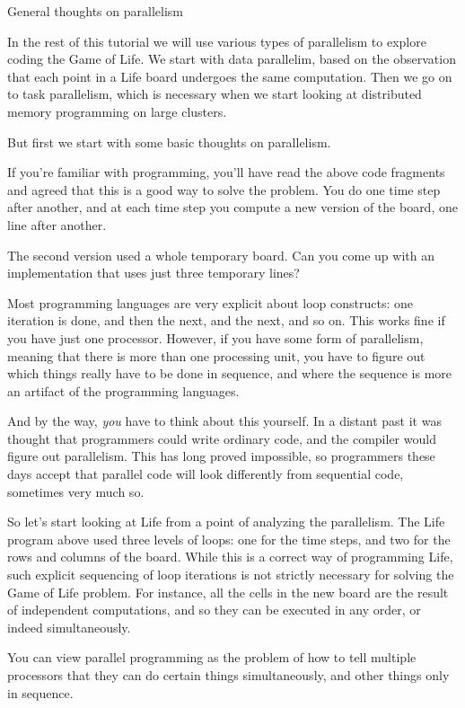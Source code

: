  {General thoughts on parallelism}

In the rest of this tutorial we will use various types of parallelism
to explore coding the Game of Life. We start with data parallelim,
based on the observation that each point in a Life board undergoes the
same computation. Then we go on to task parallelism, which is necessary
when we start
looking at distributed memory programming on large clusters.

But first we start with some basic thoughts on parallelism.

If you're familiar with programming, you'll have read the 
above code fragments and agreed that this is a good way to 
solve the problem. You do one time step after another, and
at each time step you compute 
a new version of the board, one line after another.

\begin{exercise}
  The second version used a whole temporary board. Can you come
  up with an implementation that uses just three temporary lines?
\end{exercise}

Most programming languages are very explicit about loop constructs: 
one iteration is done, and then the next, and the next, and so on.
This works fine if you 
have just one processor. However, if you have some form of parallelism,
meaning that there is more than one processing unit, you have to 
figure out which things really have to be done in sequence,
and where the sequence is more an artifact of the programming languages.

And by the way, \emph{you} have to think about this yourself.
In a distant past it was thought that programmers could write
ordinary code, and the compiler would figure out parallelism. This has
long proved impossible, so programmers these days accept that parallel
code will look differently from sequential code, sometimes very much so.

So let's start looking at Life from a point of analyzing the parallelism.
The Life program above used three levels of loops: one for the time steps,
and two for the rows and columns of the board. While this is a correct
way of programming Life,
such explicit sequencing of loop iterations
is not strictly necessary for solving the  Game of Life problem. 
For instance,
all the cells in the new board are 
the result of independent computations, and so they
can be executed in any order, or indeed simultaneously.

You can view parallel programming as the problem of how to tell 
multiple processors that they can do certain things simultaneously,
and other things only in sequence.

